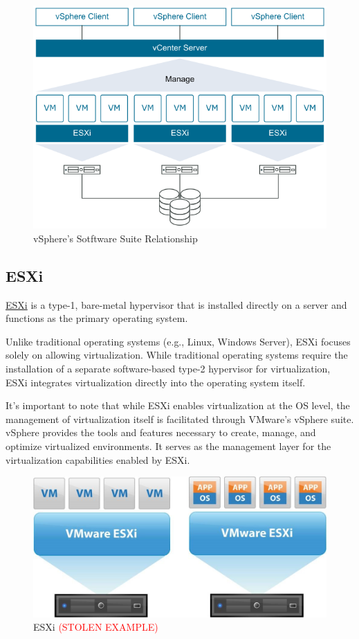 \begin{figure}[H]
    \centering
    \includegraphics[scale = 0.75]{images/vmware-infrastructure-relationship.png}
    \caption{vSphere's Sotftware Suite Relationship}
    \label{VMware}
\end{figure}

\subsection{ESXi}
\href{https://www.vmware.com/products/esxi-and-esx.html}{ESXi} is a type-1, bare-metal hypervisor that is installed directly on a server and functions as the primary operating system. 

Unlike traditional operating systems (e.g., Linux, Windows Server), ESXi focuses solely on allowing virtualization. While traditional operating systems require the installation of a separate software-based type-2 hypervisor for virtualization, ESXi integrates virtualization directly into the operating system itself.

It's important to note that while ESXi enables virtualization at the OS level, the management of virtualization itself is facilitated through VMware's vSphere suite. vSphere provides the tools and features necessary to create, manage, and optimize virtualized environments. It serves as the management layer for the virtualization capabilities enabled by ESXi.

\begin{figure}[H]
    \centering
    \includegraphics[scale = 0.55]{images/esxi.jpg}
    \caption{ESXi \textcolor{red}{(STOLEN EXAMPLE)} }
    \label{ESXi}
\end{figure}

